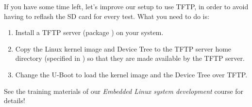 If you have some time left, let's improve our setup to use TFTP, in
order to avoid having to reflash the SD card for every test. What you
need to do is:

\begin{enumerate}

\item Install a TFTP server (package ) on your system.

\item Copy the Linux kernel image and Device Tree to
  the TFTP server home directory (specified in
  ) so that they are made available by the TFTP
  server.

\item Change the U-Boot  to load the kernel image and
  the Device Tree over TFTP.

\end{enumerate}

See the training materials of our {\em Embedded Linux system
  development} course for details!

